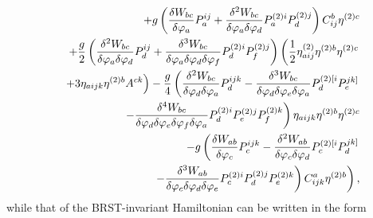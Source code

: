 \documentclass[a4paper,12pt]{article}
\begin{document}
\begin{eqnarray}
&&+g\left( \frac{\delta W_{bc}}{\delta \varphi _{a}}P_{a}^{ij}+ \frac{\delta
^{2}W_{bc}}{\delta \varphi _{a}\delta \varphi _{d}}P_{a}^{(2)i}P_{d}^{(2)j}%
\right) C_{ij}^{b}\eta ^{(2)c}  \nonumber \\
&&+\frac{g}{2}\left( \frac{\delta ^{2}W_{bc}}{\delta \varphi _{a}\delta
\varphi _{d}}P_{d}^{ij}+\frac{\delta ^{3}W_{bc}}{\delta \varphi _{a}\delta
\varphi _{d}\delta \varphi _{f}}P_{d}^{(2)i}P_{f}^{(2)j}\right) \left( \frac{%
1}{2}\eta _{aij}^{(2)}\eta ^{(2)b}\eta ^{(2)c}\right.  \nonumber \\
&&\left. +3\eta _{aijk}\eta ^{(2)b}A^{ck}\right) -\frac{g}{4}\left( \frac{%
\delta ^{2}W_{bc}}{\delta \varphi _{d}\delta \varphi _{a}}P_{d}^{ijk}-\frac{%
\delta ^{3}W_{bc}}{\delta \varphi _{d}\delta \varphi _{e}\delta \varphi _{a}}%
P_{d}^{(2)[i}P_{e}^{jk]}\right.  \nonumber \\
&&\left. -\frac{\delta ^{4}W_{bc}}{\delta \varphi _{d}\delta \varphi
_{e}\delta \varphi _{f}\delta \varphi _{a}}%
P_{d}^{(2)i}P_{e}^{(2)j}P_{f}^{(2)k}\right) \eta _{aijk}\eta ^{(2)b}\eta
^{(2)c}  \nonumber \\
&&-g\left( \frac{\delta W_{ab}}{\delta \varphi _{c}}P_{c}^{ijk}-\frac{\delta
^{2}W_{ab}}{\delta \varphi _{c}\delta \varphi _{d}}P_{c}^{(2)[i}P_{d}^{jk]}%
\right.  \nonumber \\
&&\left. \left. -\frac{\delta ^{3}W_{ab}}{\delta \varphi _{c}\delta \varphi
_{d}\delta \varphi _{e}}P_{c}^{(2)i}P_{d}^{(2)j}P_{e}^{(2)k}\right)
C_{ijk}^{a}\eta ^{(2)b}\right) ,  \label{xx92}
\end{eqnarray}
while that of the BRST-invariant Hamiltonian can be written in the form 
\end{document}
